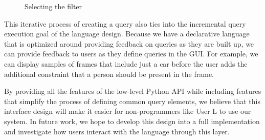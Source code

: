 \begin{figure}[H]
    \caption{Selecting the filter}
    \label{fig:Using6}
\end{figure}

This iterative process of creating a query also ties into the incremental query execution goal of the language design. Because we have a declarative language that is optimized around providing feedback on queries as they are built up, we can provide feedback to users as they define queries in the GUI. For example, we can display samples of frames that include just a car before the user adds the additional constraint that a person should be present in the frame.

By providing all the features of the low-level Python API while including features that simplify the process of defining common query elements, we believe that this interface design will make it easier for non-programmers like User L to use our system. In future work, we hope to develop this design into a full implementation and investigate how users interact with the language through this layer.
